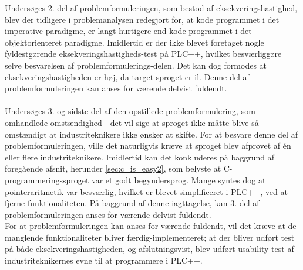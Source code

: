 \noindent Undersøges 2. del af problemformuleringen, som bestod af eksekveringshastighed, blev der tidligere i problemanalysen redegjort for, at kode programmet i det imperative paradigme, er langt hurtigere end kode programmet i det objektorienteret paradigme. Imidlertid er der ikke blevet foretaget nogle fyldestgørende eksekveringshastigheds-test på PLC++, hvilket besværliggøre selve besvarelsen af problemformulerings-delen. Det kan dog formodes at eksekveringshastigheden er høj, da target-sproget er \gls{il}. Denne del af problemformuleringen kan anses for værende delvist fuldendt. \\\\

\noindent Undersøges 3. og sidste del af den opstillede problemformulering, som omhandlede omstændighed - det vil sige at sproget ikke måtte blive så omstændigt at industriteknikere ikke ønsker at skifte. 
For at besvare denne del af problemformuleringen, ville det naturligvis kræve at sproget blev afprøvet af én eller flere industriteknikere. Imidlertid kan det konkluderes på baggrund af foregående afsnit, herunder \ref{sec:c_is_easy2}, som belyste at C-programmeringssproget var et godt begyndersprog. Mange syntes dog at pointeraritmetik var besværlig, hvilket er blevet simplificeret i PLC++, ved at fjerne funktionaliteten. På baggrund af denne iagttagelse, kan 3. del af problemformuleringen anses for værende delvist fuldendt. \\

\noindent For at problemformuleringen kan anses for værende fuldendt, vil det kræve at de manglende funktionaliteter bliver færdig-implementeret; at der bliver udført test på både eksekveringshastigheden, og afslutningsvist, blev udført usability-test af industriteknikernes evne til at programmere i PLC++.








